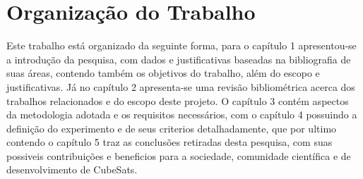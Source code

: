 \section{Organização do Trabalho}
Este trabalho está organizado da seguinte forma, para o capítulo 1 apresentou-se a introdução da 
pesquisa, com dados e justificativas baseadas na bibliografia de suas áreas, contendo 
também os objetivos do trabalho, além do escopo e justificativas. Já no capítulo 2 apresenta-se 
uma revisão bibliométrica acerca dos trabalhos relacionados e do escopo deste projeto. O 
capítulo 3 contém aspectos da metodologia adotada e os requisitos necessários, com o capítulo 
4 possuindo a definição do experimento e de seus criterios detalhadamente, que por ultimo 
contendo o capítulo 5 traz as conclusões retiradas desta pesquisa, com suas possiveis contribuições 
e beneficios para a sociedade, comunidade científica e de desenvolvimento de CubeSats.

